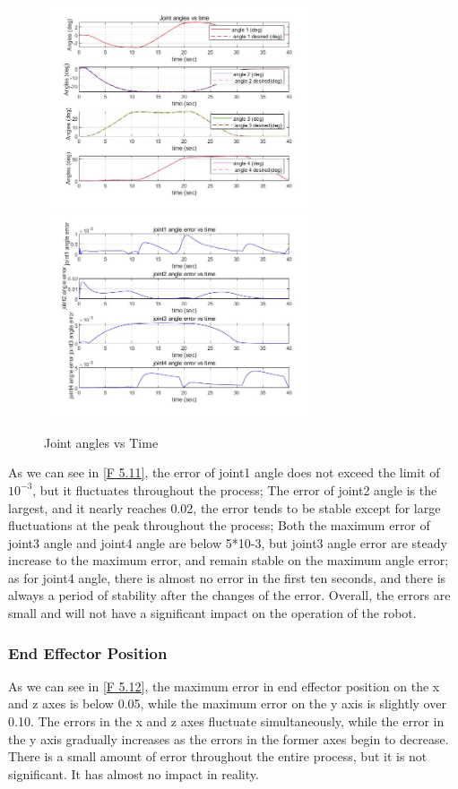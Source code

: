 \begin{figure}[htbp]
	\centering
	\includegraphics[width=8cm]{./fig/4.jpg}
	\includegraphics[width=8cm]{./fig/7.jpg}
	\caption{Joint angles vs Time}
	\label{F 5.11}
\end{figure}

As we can see in \autoref{F 5.11}, the error of joint1 angle does not exceed the limit of $10^{-3}$, but it fluctuates throughout the process;
The error of joint2 angle is the largest, and it nearly reaches 0.02, the error tends to be stable except for large fluctuations at the peak throughout the process;
Both the maximum error of joint3 angle and joint4 angle are below 5*10-3, but joint3 angle error are steady increase to the maximum error, and remain stable on the maximum angle error; as for joint4 angle, there is almost no error in the first ten seconds, and there is always a period of stability after the changes of the error.
Overall, the errors are small and will not have a significant impact on the operation of the robot.

\subsubsection*{End Effector Position}


As we can see in \autoref{F 5.12}, the maximum error in end effector position on the x and z axes is below 0.05, while the maximum error on the y axis is slightly over 0.10. The errors in the x and z axes fluctuate simultaneously, while the error in the y axis gradually increases as the errors in the former axes begin to decrease. There is a small amount of error throughout the entire process, but it is not significant. It has almost no impact in reality.

